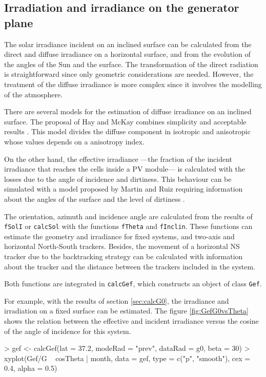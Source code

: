 \documentclass[a4paper]{article}
\renewenvironment{Schunk}{\vspace{\topsep}}{\vspace{\topsep}}
\newcommand{\code}[1]{{\texttt{#1}}}
\begin{document}
\subsection{Irradiation and irradiance on the generator plane}
\label{sec:effective}

The solar irradiance incident on an inclined surface can be calculated
from the direct and diffuse irradiance on a horizontal surface, and
from the evolution of the angles of the Sun and the surface. The
transformation of the direct radiation is straightforward since only
geometric considerations are needed. However, the treatment of the
diffuse irradiance is more complex since it involves the modelling of
the atmosphere.

There are several models for the estimation of diffuse irradiance on
an inclined surface. The proposal of Hay and McKay combines simplicity
and acceptable results \cite{Hay.McKay1985}. This model divides the
diffuse component in isotropic and anisotropic whose values depends on
a anisotropy index.  

On the other hand, the effective irradiance ---the fraction of the
incident irradiance that reaches the cells inside a PV module--- is
calculated with the losses due to the angle of incidence and
dirtiness. This behaviour can be simulated with a model proposed by
Martin and Ruiz requiring information about the angles of the surface
and the level of dirtiness \cite{Martin.Ruiz2001}.

The orientation, azimuth and incidence angle are calculated from the
results of \code{fSolI} or \code{calcSol} with the functions
\code{fTheta} and \code{fInclin}. These functions can estimate
the geometry and irradiance for fixed systems, and two-axis and
horizontal North-South trackers. Besides, the movement of a horizontal NS
tracker due to the backtracking strategy \cite{Panico.Garvison.ea1991}
can be calculated with information about the tracker and the distance
between the trackers included in the system.

Both functions are integrated in \code{calcGef}, which constructs an
object of class \code{Gef}. 

For example, with the results of section \ref{sec:calcG0}, the
irradiance and irradiation on a fixed surface can be estimated. The figure
\ref{fig:GefG0vsTheta} shows the relation between the effective and
incident irradiance versus the cosine of the angle of incidence for
this system.

\begin{Schunk}
\begin{Sinput}
> gef <- calcGef(lat = 37.2, modeRad = "prev", dataRad = g0, 
      beta = 30)
> xyplot(Gef/G ~ cosTheta | month, data = gef, type = c("p", 
      "smooth"), cex = 0.4, alpha = 0.5)
\end{Sinput}
\end{Schunk}
\end{document}
